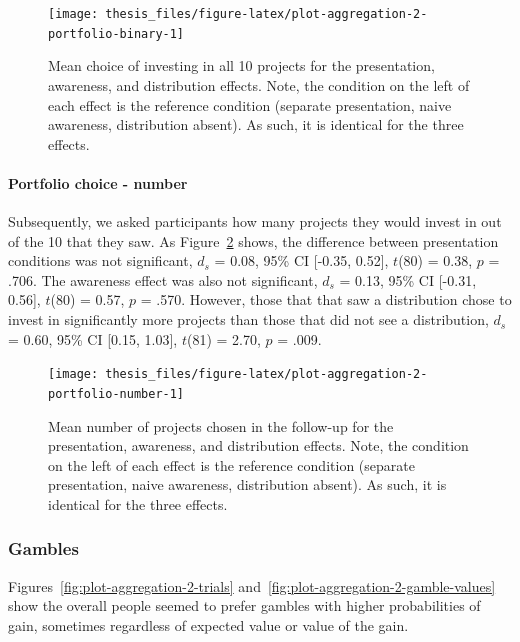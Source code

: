 \documentclass[a4paper, nobind, dvipsnames]{templates/ociamthesis}
\theoremstyle{definition}
\theoremstyle{definition}
\theoremstyle{definition}
\theoremstyle{definition}
\theoremstyle{remark}
\begin{document}
\begin{figure}
\texttt{[image: thesis\_files/figure-latex/plot-aggregation-2-portfolio-binary-1]} \caption{Mean choice of investing in all 10 projects for the presentation, awareness, and distribution effects. Note, the condition on the left of each effect is the reference condition (separate presentation, naive awareness, distribution absent). As such, it is identical for the three effects.}\label{fig:plot-aggregation-2-portfolio-binary}
\end{figure}

\hypertarget{portfolio-choice---number}{%
\paragraph{Portfolio choice - number}\label{portfolio-choice---number}}

Subsequently, we asked participants how many projects they would invest in out
of the 10 that they saw. As
Figure~\ref{fig:plot-aggregation-2-portfolio-number} shows, the difference
between presentation conditions was not significant,
\(d_s\) = 0.08, 95\% CI {[}-0.35, 0.52{]}, \(t\)(80) = 0.38, \(p\) = .706. The awareness effect
was also not significant, \(d_s\) = 0.13, 95\% CI {[}-0.31, 0.56{]}, \(t\)(80) = 0.57, \(p\) = .570.
However, those that that saw a distribution chose to invest in significantly
more projects than those that did not see a distribution,
\(d_s\) = 0.60, 95\% CI {[}0.15, 1.03{]}, \(t\)(81) = 2.70, \(p\) = .009.



\begin{figure}
\texttt{[image: thesis\_files/figure-latex/plot-aggregation-2-portfolio-number-1]} \caption{Mean number of projects chosen in the follow-up for the presentation, awareness, and distribution effects. Note, the condition on the left of each effect is the reference condition (separate presentation, naive awareness, distribution absent). As such, it is identical for the three effects.}\label{fig:plot-aggregation-2-portfolio-number}
\end{figure}

\hypertarget{gambles}{%
\subsubsection{Gambles}\label{gambles}}

Figures~\ref{fig:plot-aggregation-2-trials}
and~\ref{fig:plot-aggregation-2-gamble-values} show the overall people seemed
to prefer gambles with higher probabilities of gain, sometimes regardless of
expected value or value of the gain.
\end{document}
